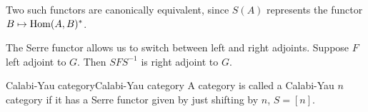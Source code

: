 Two such functors are canonically equivalent, since $S(A)$ represents the functor $B\mapsto\operatorname{Hom}(A,B)^*$.




The Serre functor allows us to switch between left and right adjoints. Suppose $F$ left adjoint to $G$. Then $SFS^{-1}$ is right adjoint to $G$.


\begin{definition}{Calabi-Yau category}{Calabi-Yau category}
    A category is called a Calabi-Yau $n$ category if it has a Serre functor given by just shifting by $n$, $S=[n]$.
\end{definition}


